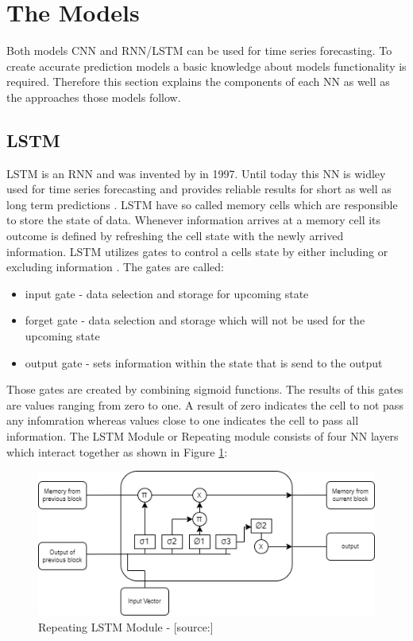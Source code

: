 \section{The Models}
Both models CNN and RNN/LSTM can be used for time series forecasting. To create accurate prediction models a basic knowledge about models functionality is required. Therefore this section explains the components of each NN as well as the approaches those models follow. 

\subsection{LSTM}
\label{sec:lstm}
LSTM is an RNN and was invented by \cite{lstm_inventor} in 1997. Until today this NN is widley used for time series forecasting and provides reliable results for short as well as long term predictions \cite{rnn_moharm}. LSTM have so called memory cells which are responsible to store the state of data. Whenever information arrives at a memory cell its outcome is defined by refreshing the cell state with the newly arrived information. LSTM utilizes gates to control a cells state by either including or excluding information \cite{lstm_stock}. The gates are called: 
\begin{itemize}
\item input gate - data selection and storage for upcoming state
\item forget gate - data selection and storage which will not be used for the upcoming state
\item output gate - sets information within the state that is send to the output
\end{itemize}
Those gates are created by combining sigmoid functions. The results of this gates are values ranging from zero to one. A result of zero indicates the cell to not pass any infomration whereas values close to one indicates the cell to pass all information. 
The LSTM Module or Repeating module consists of four NN layers which interact together as shown in Figure \ref{fig:lstm_rep_model}:
\begin{figure}[H]
	\centering
		\includegraphics[width=14cm]{images/lstm_module}
	\caption{Repeating LSTM Module - [source:\cite{lstm_module}]}
	\label{fig:lstm_rep_model}
\end{figure}
